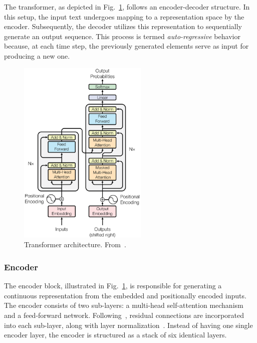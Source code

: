 The transformer, as depicted in Fig.~\ref{fig:transformer_architecture}, follows an encoder-decoder structure. In this setup, the input text undergoes mapping to a representation space by the encoder. Subsequently, the decoder utilizes this representation to sequentially generate an output sequence. This process is termed \textit{auto-regressive} behavior because, at each time step, the previously generated elements serve as input for producing a new one.

\begin{figure}[!ht]
\begin{center}
\includegraphics[width=0.55\textwidth]{Figures/Background/transformer_architecture.png}
\caption{Transformer architecture. From~\cite{vaswani2017attention}.}
\label{fig:transformer_architecture}
\end{center}
\end{figure}

\subsubsection{Encoder}

The encoder block, illustrated in Fig.~\ref{fig:transformer_architecture}, is responsible for generating a continuous representation from the embedded and positionally encoded inputs. The encoder consists of two sub-layers: a multi-head self-attention mechanism and a feed-forward network. Following~\cite{he2016deep}, residual connections are incorporated into each sub-layer, along with layer normalization~\cite{ba2016layer}. Instead of having one single encoder layer, the encoder is structured as a stack of six identical layers.

